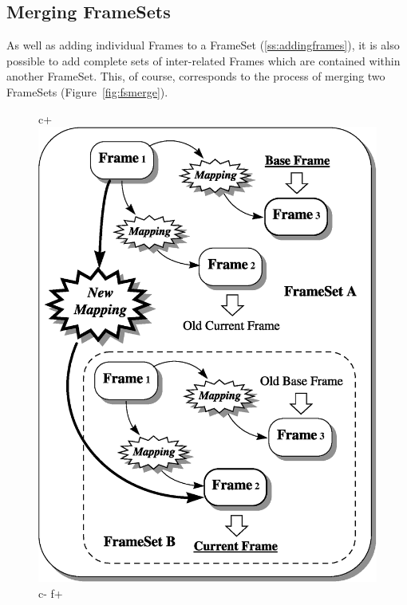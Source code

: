 \documentclass[twoside,11pt]{article}
\newenvironment{latexonly}{}{}
\newcommand{\secref}[1]{\S\ref{#1}}
\renewcommand{\secref}[1]{\ref{#1}}
\begin{document}
\subsection{Merging FrameSets}

\begin{latexonly}
   As well as adding individual Frames to a FrameSet
   (\secref{ss:addingframes}), it is also possible to add complete sets of
   inter-related Frames which are contained within another
   FrameSet. This, of course, corresponds to the process of merging two
   FrameSets (Figure~\ref{fig:fsmerge}).
   \begin{figure}[hbtp]
   \begin{center}
c+
   \includegraphics[scale=0.6]{sun211_figures/fsmerge.eps}
c-
f+

\end{center}
\end{figure}
\end{latexonly}
\end{document}
